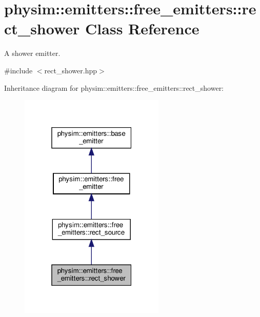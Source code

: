 \hypertarget{classphysim_1_1emitters_1_1free__emitters_1_1rect__shower}{}\section{physim\+:\+:emitters\+:\+:free\+\_\+emitters\+:\+:rect\+\_\+shower Class Reference}
\label{classphysim_1_1emitters_1_1free__emitters_1_1rect__shower}


A shower emitter.  




{\ttfamily \#include $<$rect\+\_\+shower.\+hpp$>$}



Inheritance diagram for physim\+:\+:emitters\+:\+:free\+\_\+emitters\+:\+:rect\+\_\+shower\+:\nopagebreak
\begin{figure}[H]
\begin{center}
\leavevmode
\includegraphics[width=196pt]{classphysim_1_1emitters_1_1free__emitters_1_1rect__shower__inherit__graph}
\end{center}
\end{figure}


